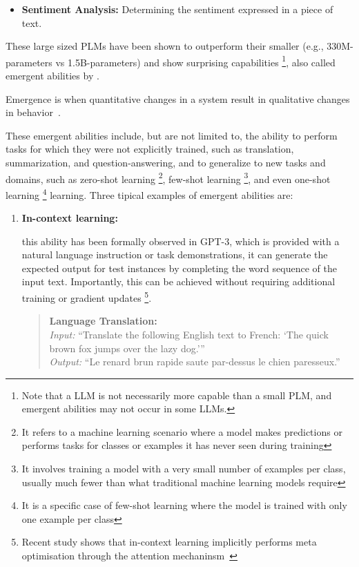 \begin{enumerate}
{\begin{itemize}
			      \item \textbf{Sentiment Analysis:} Determining the sentiment expressed in a piece of text.
		      \end{itemize}
		      These large sized PLMs have been shown to outperform their smaller (e.g., 330M-parameters vs 1.5B-parameters) and show surprising capabilities \footnote{Note that a LLM is not necessarily more capable than a small PLM, and emergent abilities may not occur in some LLMs.}, also called emergent abilities by \textcite{wei2022emergent}.
		      \begin{displayquote}
			      Emergence is when quantitative changes in a system result in qualitative changes in behavior~\cite{anderson1972more}.
		      \end{displayquote}
		      These emergent abilities include, but are not limited to, the ability to perform tasks for which they were not explicitly trained, such as translation, summarization, and question-answering, and to generalize to new tasks and domains, such as zero-shot learning \footnote{It refers to a machine learning scenario where a model makes predictions or performs tasks for classes or examples it has never seen during training}, few-shot learning \footnote{It involves training a model with a very small number of examples per class, usually much fewer than what traditional machine learning models require}, and even one-shot learning \footnote{It is a specific case of few-shot learning where the model is trained with only one example per class} learning.
		      Three tipical examples of emergent abilities are:
		      \begin{enumerate}
			      \item \textbf{In-context learning:} {this ability has been formally observed in GPT-3, which is provided with a natural language instruction or task demonstrations, it can generate the expected output for test instances by completing the word sequence of the input text. Importantly, this can be achieved without requiring additional training or gradient updates \footnote{Recent study shows that in-context learning implicitly performs meta optimisation through the attention mechaninsm~\cite{dai2022why}}.
				            \begin{quote}
					            \textbf{Language Translation:} \\
					            \textit{Input:} {\enquote{Translate the following English text to French: `The quick brown fox jumps over the lazy dog.'}} \\
					            \textit{Output:} {\enquote{Le renard brun rapide saute par-dessus le chien paresseux.}}\\

\end{quote}}
\end{enumerate}}
\end{enumerate}
